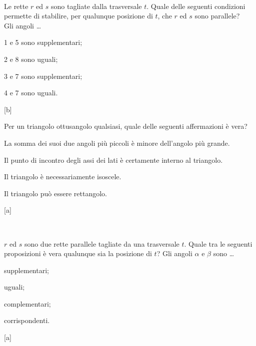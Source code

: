 \begin{esercizio}
\label{ese:3.112}
~\\
\noindent\begin{minipage}{0.6\textwidth}
Le rette $r$ ed $s$ sono tagliate dalla trasversale $t$. Quale delle 
seguenti condizioni permette di stabilire, per qualunque posizione di 
$t$, che $r$ ed $s$ sono parallele?\\
Gli angoli \ldots{}
\begin{enumeratea}
\item 1 e 5 sono supplementari;
\item 2 e 8 sono uguali;
\item 3 e 7 sono supplementari;
\item 4 e 7 sono uguali.
\end{enumeratea}
\end{minipage}\hfil
\begin{minipage}{0.4\textwidth}
\centering
\end{minipage}
\hfill [b]
\end{esercizio}

\begin{esercizio}
\label{ese:3.113}
Per un triangolo ottusangolo qualsiasi, quale delle seguenti 
affermazioni è vera?
\begin{enumeratea}
\item La somma dei suoi due angoli più piccoli è minore dell'angolo 
più grande.
\item Il punto di incontro degli assi dei lati è certamente interno 
al triangolo.
\item Il triangolo è necessariamente isoscele.
\item Il triangolo può essere rettangolo.
\end{enumeratea}
\hfill [a]
\end{esercizio}

\begin{esercizio}
\label{ese:3.114}
~\\
\noindent\begin{minipage}{0.65\textwidth}
$r$ ed $s$ sono due rette parallele tagliate da una trasversale $t$. 
Quale tra le seguenti proposizioni è vera qualunque sia la posizione 
di $t$?
Gli angoli $\alpha$ e $\beta$ sono \ldots{}
\begin{enumeratea}
\item supplementari;
\item uguali;
\item complementari;
\item corrispondenti.
\end{enumeratea}
\end{minipage}\hfil
\begin{minipage}{0.35\textwidth}
\centering
\end{minipage}
\hfill [a]
\end{esercizio}

